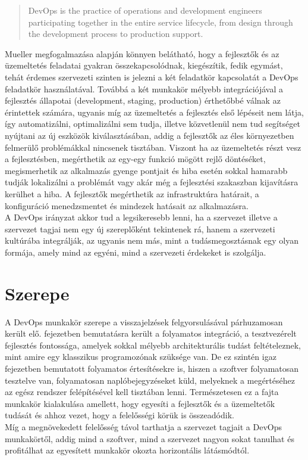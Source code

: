 \begin{quote}
DevOps is the practice of operations and development engineers participating together in the entire service lifecycle, from design through the development process to production support.
\end{quote}
\begin{flushright}
\citet*{agile_admin}
\end{flushright}

Mueller megfogalmazása alapján könnyen belátható, hogy a fejlesztők és az üzemeltetés feladatai gyakran összekapcsolódnak, kiegészítik, fedik egymást, tehát érdemes szervezeti szinten is jelezni a két feladatkör kapcsolatát a DevOps feladatkör használatával.
Továbbá a két munkakör mélyebb integrációjával a fejlesztés állapotai (development, staging, production) érthetőbbé válnak az érintettek számára, ugyanis míg az üzemeltetés a fejlesztés első lépéseit nem látja, így automatizálni, optimalizálni sem tudja, illetve közvetlenül nem tud segítséget nyújtani az új eszközök kiválasztásában, addig a fejlesztők az éles környezetben felmerülő problémákkal nincsenek tisztában. Viszont ha az üzemeltetés részt vesz a fejlesztésben, megérthetik az egy-egy funkció mögött rejlő döntéséket, megismerhetik az alkalmazás gyenge pontjait és hiba esetén sokkal hamarabb tudják lokalizálni a problémát vagy akár még a fejlesztési szakaszban kijavításra kerülhet a hiba. A fejlesztők megérthetik az infrastruktúra határait, a konfiguráció menedzsmentet és mindezek hatásait az alkalmazásra.\\
A DevOps irányzat akkor tud a legsikeresebb lenni, ha a szervezet illetve a szervezet tagjai nem egy új szereplőként tekintenek rá, hanem a szervezeti kultúrába integrálják, az ugyanis nem más, mint a tudásmegosztásnak egy olyan formája, amely mind az egyéni, mind a szervezeti érdekeket is szolgálja.

\section{Szerepe}

A DevOps munkakör szerepe a visszajelzések felgyorsulásával párhuzamosan került elő.  fejezetben bemutatásra került a folyamatos integráció, a tesztvezérelt fejlesztés fontossága, amelyek sokkal mélyebb architekturális tudást feltételeznek, mint amire egy klasszikus programozónak szüksége van. De ez szintén igaz  fejezetben bemutatott folyamatos értesítésekre is, hiszen a szoftver folyamatosan tesztelve van, folyamatosan naplóbejegyzéseket küld, melyeknek a megértéséhez az egész rendszer felépítésével kell tisztában lenni. Természetesen ez a fajta munkakör kialakulása amellett, hogy egyesíti a fejlesztők és a üzemeltetők tudását és ahhoz vezet, hogy a felelősségi körük is összeadódik.\\
Míg a megnövekedett felelősség távol tarthatja a szervezet tagjait a DevOps munkakörtől, addig mind a szoftver, mind a szervezet nagyon sokat tanulhat és profitálhat az egyesített munkakör okozta horizontális látásmódtól.

